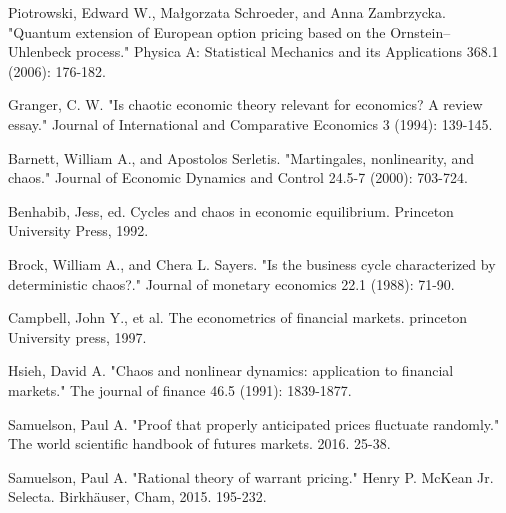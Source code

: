 \documentclass[a4paper,titlepage,12pt,fleqn,oneside]{report}
\begin{document}
\begin{thebibliography}{99}
\begin{LTRitems}
	Piotrowski, Edward W., Małgorzata Schroeder, and Anna Zambrzycka. "Quantum extension of European option pricing based on the Ornstein–Uhlenbeck process." Physica A: Statistical Mechanics and its Applications 368.1 (2006): 176-182.
\end{LTRitems}

\begin{LTRitems}
	Granger, C. W. "Is chaotic economic theory relevant for economics? A review essay." Journal of International and Comparative Economics 3 (1994): 139-145.
\end{LTRitems}

\begin{LTRitems}
	Barnett, William A., and Apostolos Serletis. "Martingales, nonlinearity, and chaos." Journal of Economic Dynamics and Control 24.5-7 (2000): 703-724.
\end{LTRitems}

\begin{LTRitems}
	Benhabib, Jess, ed. Cycles and chaos in economic equilibrium. Princeton University Press, 1992.
\end{LTRitems}

\begin{LTRitems}
	Brock, William A., and Chera L. Sayers. "Is the business cycle characterized by deterministic chaos?." Journal of monetary economics 22.1 (1988): 71-90.
\end{LTRitems}

\begin{LTRitems}
	Campbell, John Y., et al. The econometrics of financial markets. princeton University press, 1997.
\end{LTRitems}

\begin{LTRitems}
	Hsieh, David A. "Chaos and nonlinear dynamics: application to financial markets." The journal of finance 46.5 (1991): 1839-1877.
\end{LTRitems}

\begin{LTRitems}
	Samuelson, Paul A. "Proof that properly anticipated prices fluctuate randomly." The world scientific handbook of futures markets. 2016. 25-38.
\end{LTRitems}

\begin{LTRitems}
	Samuelson, Paul A. "Rational theory of warrant pricing." Henry P. McKean Jr. Selecta. Birkhäuser, Cham, 2015. 195-232.
\end{LTRitems}


\end{thebibliography}
\end{document}
